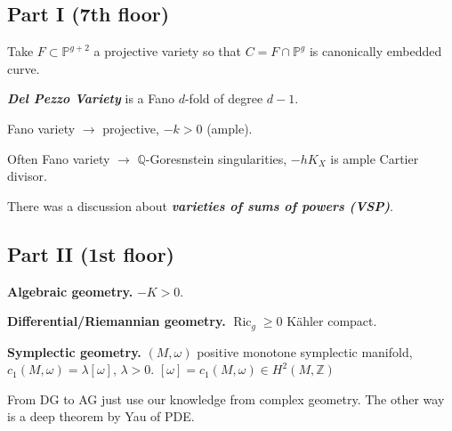 \subsection{Part I (7th floor)}

Take $F\subset \mathbb{P}^{g+2}$ a projective variety so that $C=F \cap\mathbb{P}^g$ is  canonically embedded curve.

\begin{defn}\leavevmode
	\textit{\textbf{Del Pezzo Variety}} is a Fano $d$-fold of degree $d-1$.
\end{defn}

\begin{defn}\leavevmode
	Fano variety $\to $ projective, $-k>0$ (ample).
\end{defn}

\begin{remark}\leavevmode
	Often Fano variety $\to$ $\mathbb{Q}$-Goresnstein singularities, $-h K_X$ is ample Cartier divisor.
\end{remark}
\iffalse
\begin{question}\leavevmode
	What is the relationship between Fano varieties and positive curvature?
\end{question}\fi

There was a discussion about \textit{\textbf{varieties of sums of powers (VSP)}}.
\iffalse which are
 \begin{align*}
\operatorname{ V SP}(f_d,k)&=\left\{ \ell_1,\ldots,\ell_p \in \mathbb{P}( V^*):\exists \alpha_1,\ldots,\alpha_k \in \mathbb{C},\;  \right\} 
\end{align*}
\fi

\subsection{Part II (1st floor)}

{\bfseries Algebraic geometry.}\hspace{.5em} $-K>0$.

 {\bfseries Differential/Riemannian geometry.}\hspace{.5em} $\operatorname{Ric}_g \geq 0$ Kähler compact.

 {\bfseries Symplectic geometry.}\hspace{.5em} $(M,\omega)$ positive monotone symplectic manifold, $c_1(M,\omega)=\lambda[\omega]$, $\lambda>0$. $[\omega] = c_1(M,\omega)\in H^{2}(M, \mathbb{Z})$

From DG to AG just use our knowledge from complex geometry. The other way is a deep theorem by Yau of PDE.

